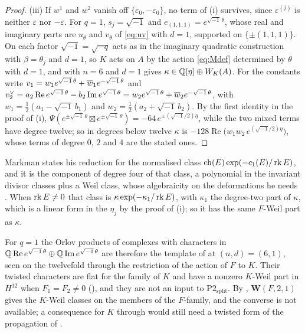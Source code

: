 \begin{proof}
(iii) If $w^{1}$ and $w^{2}$ vanish off $\{\varepsilon_{0},-\varepsilon_{0}\}$,
no term of (i) survives, since $\varepsilon^{(j)}$ is neither $\varepsilon$
nor $-\varepsilon$. For $q=1$, $s_{j}=\sqrt{-1}$ and
$e_{(1,1,1)}=e^{\sqrt{-1}\,\theta}$, whose real and imaginary parts are
$u_{\theta}$ and $v_{\theta}$ of \eqref{eq:uv} with $d=1$, supported on
$\{\pm(1,1,1)\}$. On each factor $\sqrt{-1}=\sqrt{-q}$ acts as in the
imaginary quadratic construction with $\beta=\theta_{j}$ and $d=1$, so $K$
acts on $A$ by the action \eqref{eq:Mdef} determined by $\theta$ with $d=1$,
and  with $n=6$ and $d=1$ gives
$\kappa\in\mathbb{Q}[\eta]\oplus W_{K}(A)$. For the constants write
$v_{1}=w_{1}e^{\sqrt{-1}\,\theta}+\overline{w}_{1}e^{-\sqrt{-1}\,\theta}$ and
$v_{2}^{\vee}=a_{2}\operatorname{Re}e^{\sqrt{-1}\,\theta}
-b_{2}\operatorname{Im}e^{\sqrt{-1}\,\theta}
=w_{2}e^{\sqrt{-1}\,\theta}+\overline{w}_{2}e^{-\sqrt{-1}\,\theta}$, with
$w_{1}=\frac12(a_{1}-\sqrt{-1}\,b_{1})$ and $w_{2}=\frac12(a_{2}+\sqrt{-1}\,
b_{2})$. By the first identity in the proof of (i),
$\Psi(e^{\pm\sqrt{-1}\,\theta}\boxtimes e^{\pm\sqrt{-1}\,\theta})
=-64\,e^{\pm(\sqrt{-1}/2)\eta}$, while the two mixed terms have degree
twelve; so in degrees below twelve $\kappa$ is
$-128\operatorname{Re}\bigl(w_{1}w_{2}\,e^{(\sqrt{-1}/2)\eta}\bigr)$, whose
terms of degree $0$, $2$ and $4$ are the stated ones.
\end{proof}

Markman states his reduction for the normalised class
$\operatorname{ch}(E)\exp(-c_{1}(E)/\operatorname{rk} E)$, and it is the component of degree four of that
class, a polynomial in the invariant divisor classes plus a Weil class, whose
algebraicity on the deformations he needs \cite[Proposition~10.2.1,
Corollary~10.2.3]{Mar25c}. When $\operatorname{rk} E\ne0$ that class is
$\kappa\exp(-\kappa_{1}/\operatorname{rk} E)$, with $\kappa_{1}$ the degree-two part of
$\kappa$, which is a linear form in the $\eta_{j}$ by the proof of
(i); so it has the same $F$-Weil part as $\kappa$.

For $q=1$ the Orlov products of complexes with characters in
$\mathbb{Q}\operatorname{Re}e^{\sqrt{-1}\,\theta}\oplus\mathbb{Q}\operatorname{Im}
e^{\sqrt{-1}\,\theta}$ are therefore the template of
 at $(n,d)=(6,1)$, seen on the twelvefold through the
restriction of the action of $F$ to $K$. Their twisted characters are flat
for the family of $K$ and have a nonzero $K$-Weil part in $H^{12}$ when
$F_{1}=F_{2}\ne0$ (), and they are not an input to
$\mathrm{P2}_{\mathrm{split}}$. By , $\mathbf{W}(F,2,1)$
gives the $K$-Weil classes on the members of the $F$-family, and the converse
is not available; a consequence for $K$ through  would
still need a twisted form of the propagation of .

